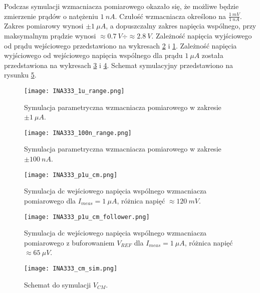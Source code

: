     Podczas symulacji wzmacniacza pomiarowego okazało się, że możliwe będzie zmierzenie prądów o natężeniu $1\ nA$. Czułość 
    wzmacniacza określono na $\frac{1\ mV}{1\ nA}$. Zakres pomiarowy wynosi $\pm 1\ \mu A$, a dopuszczalny zakres napięcia 
    wspólnego, przy maksymalnym prądzie wynosi $\approx 0.7\ V \div \approx 2.8\ V$. Zależność napięcia wyjściowego 
    od prądu wejściowego przedstawiono na wykresach \ref{fig:sym_INA_100n} i \ref{fig:sym_INA_1u}. 
    Zależność napięcia wyjściowego od wejściowego napięcia wspólnego dla prądu $1\ \mu A$ została przedstawiona na wykresach 
    \ref{fig:sym_INA_CM} i \ref{fig:sym_INA_CM_follower}. Schemat symulacyjny przedstawiono na rysunku \ref{fig:sym_CM_sch}.
    \begin{figure}[!ht]
        \centering
        \texttt{[image: INA333\_1u\_range.png]}
        \caption{Symulacja parametryczna wzmacniacza pomiarowego w zakresie $\pm 1\ \mu A$.}
        \label{fig:sym_INA_1u}
    \end{figure}
    \begin{figure}[!ht]
        \centering
        \texttt{[image: INA333\_100n\_range.png]}
        \caption{Symulacja parametryczna wzmacniacza pomiarowego w zakresie $\pm 100\ nA$.}
        \label{fig:sym_INA_100n}
    \end{figure}
    \begin{figure}[!ht]
        \centering
        \texttt{[image: INA333\_p1u\_cm.png]}
        \caption{Symulacja dc wejściowego napięcia wspólnego wzmacniacza pomiarowego dla $I_{meas} = 1\ \mu A$, różnica napięć $\approx 120\ mV$.}
        \label{fig:sym_INA_CM}
    \end{figure}
    \clearpage
    \begin{figure}[!ht]
        \centering
        \texttt{[image: INA333\_p1u\_cm\_follower.png]}
        \caption{Symulacja dc wejściowego napięcia wspólnego wzmacniacza pomiarowego z buforowaniem $V_{REF}$ dla $I_{meas} = 1\ \mu A$, różnica napięć $\approx 65\ \mu V$.}
        \label{fig:sym_INA_CM_follower}
    \end{figure}
    \begin{figure}[!ht]
        \centering
        \texttt{[image: INA333\_cm\_sim.png]}
        \caption{Schemat do symulacji $V_{CM}$.}
        \label{fig:sym_CM_sch}
    \end{figure}
